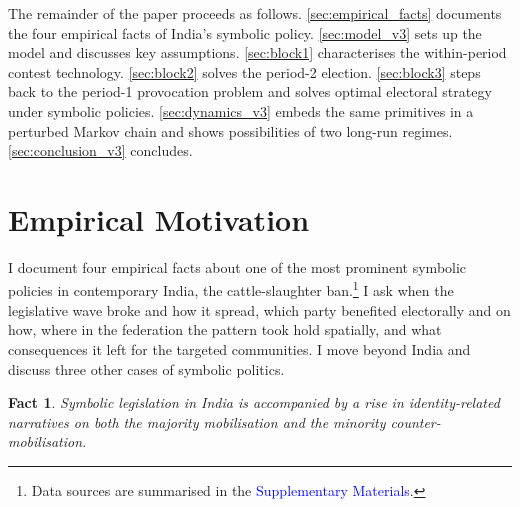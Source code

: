 \documentclass[11pt,twoside]{extarticle}
\newtheorem{fact}{Fact}
\newcommand{\suppmat}{\textcolor{blue}{Supplementary Materials}}
\begin{document}

The remainder of the paper proceeds as follows. \autoref{sec:empirical_facts} documents the four empirical facts of India's symbolic policy. \autoref{sec:model_v3} sets up the model and discusses key assumptions. \autoref{sec:block1} characterises the within-period contest technology. \autoref{sec:block2} solves the period-2 election. \autoref{sec:block3} steps back to the period-1 provocation problem and solves optimal electoral strategy under symbolic policies. \autoref{sec:dynamics_v3} embeds the same primitives in a perturbed Markov chain and shows possibilities of two long-run regimes. \autoref{sec:conclusion_v3} concludes.


\section{Empirical Motivation} \label{sec:empirical_facts}

I document four empirical facts about one of the most prominent symbolic policies in contemporary India, the cattle-slaughter ban.\footnote{Data sources are summarised in the \suppmat.} I ask when the legislative wave broke and how it spread, which party benefited electorally and on how, where in the federation the pattern took hold spatially, and what consequences it left for the targeted communities. I move beyond India and discuss three other cases of symbolic politics.

\begin{fact}\label{fact:1}
Symbolic legislation in India is accompanied by a rise in identity-related narratives on both the majority mobilisation and the minority counter-mobilisation.
\end{fact}
\end{document}
